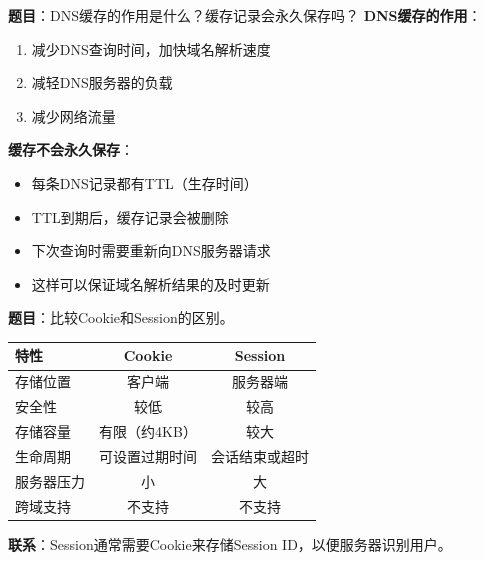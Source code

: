 \begin{examplebox}
\textbf{题目}：DNS缓存的作用是什么？缓存记录会永久保存吗？
\tcblower
\textbf{DNS缓存的作用}：
\begin{enumerate}[itemsep=0pt]
    \item 减少DNS查询时间，加快域名解析速度
    \item 减轻DNS服务器的负载
    \item 减少网络流量
\end{enumerate}

\textbf{缓存不会永久保存}：
\begin{itemize}[itemsep=0pt]
    \item 每条DNS记录都有TTL（生存时间）
    \item TTL到期后，缓存记录会被删除
    \item 下次查询时需要重新向DNS服务器请求
    \item 这样可以保证域名解析结果的及时更新
\end{itemize}
\end{examplebox}

\begin{examplebox}
\textbf{题目}：比较Cookie和Session的区别。
\tcblower
\begin{center}\small
\begin{tabular}{|l|c|c|}
\hline
\textbf{特性} & \textbf{Cookie} & \textbf{Session} \\
\hline
存储位置 & 客户端 & 服务器端 \\
安全性 & 较低 & 较高 \\
存储容量 & 有限（约4KB） & 较大 \\
生命周期 & 可设置过期时间 & 会话结束或超时 \\
服务器压力 & 小 & 大 \\
跨域支持 & 不支持 & 不支持 \\
\hline
\end{tabular}
\end{center}

\textbf{联系}：Session通常需要Cookie来存储Session ID，以便服务器识别用户。
\end{examplebox}
